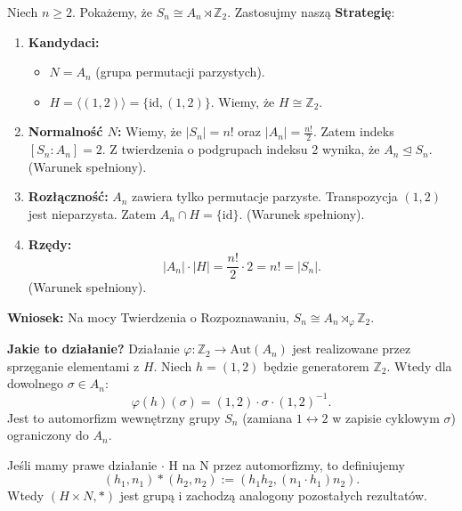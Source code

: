 \begin{eg}
Niech $n \ge 2$. Pokażemy, że $S_n \cong A_n \rtimes \mathbb{Z}_2$. Zastosujmy naszą \textbf{Strategię}:

\begin{enumerate}[label=\textbf{\arabic*.}]
    \item \textbf{Kandydaci:} 
    \begin{itemize}
        \item $N = A_n$ (grupa permutacji parzystych).
        \item $H = \langle (1,2) \rangle = \{\text{id}, (1,2)\}$. Wiemy, że $H \cong \mathbb{Z}_2$.
    \end{itemize}
    
    \item \textbf{Normalność $N$:} 
    Wiemy, że $|S_n| = n!$ oraz $|A_n| = \frac{n!}{2}$. Zatem indeks $[S_n : A_n] = 2$.
    Z twierdzenia o podgrupach indeksu 2 wynika, że $A_n \unlhd S_n$. (Warunek spełniony).
    
    \item \textbf{Rozłączność:} 
    $A_n$ zawiera tylko permutacje parzyste. Transpozycja $(1,2)$ jest nieparzysta.
    Zatem $A_n \cap H = \{\text{id}\}$. (Warunek spełniony).
    
    \item \textbf{Rzędy:} 
    \[ |A_n| \cdot |H| = \frac{n!}{2} \cdot 2 = n! = |S_n|. \]
    (Warunek spełniony).
\end{enumerate}

\textbf{Wniosek:} Na mocy Twierdzenia o Rozpoznawaniu, $S_n \cong A_n \rtimes_\varphi \mathbb{Z}_2$.

\textbf{Jakie to działanie?}
Działanie $\varphi: \mathbb{Z}_2 \to \text{Aut}(A_n)$ jest realizowane przez sprzęganie elementami z $H$. Niech $h = (1,2)$ będzie generatorem $\mathbb{Z}_2$. Wtedy dla dowolnego $\sigma \in A_n$:
\[ \varphi(h)(\sigma) = (1,2) \cdot \sigma \cdot (1,2)^{-1}. \]
Jest to automorfizm wewnętrzny grupy $S_n$ (zamiana $1 \leftrightarrow 2$ w zapisie cyklowym $\sigma$) ograniczony do $A_n$.
\end{eg}
\begin{remark}

Jeśli mamy prawe działanie $\cdot $ H na N przez automorfizmy, to definiujemy \[
	\left( h_1,n_1 \right) * \left( h_2,n_2 \right) := \left( h_1h_2, \left( n_1\cdot h_1 \right)n_2 \right) 
.\] 
Wtedy $\left( H\times N,* \right) $ jest grupą i zachodzą analogony pozostałych rezultatów.

\end{remark} 

